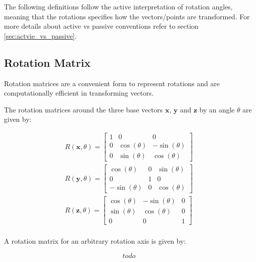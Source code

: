 \documentclass[a4paper]{paper}
\begin{document}
The following definitions follow the active interpretation of rotation angles, meaning that the rotations specifies how the vectors/points are transformed. For more details about active vs passive conventions refer to section \ref{sec:actvie_vs_passive}.

\subsection{Rotation Matrix}

Rotation matrices are a convenient form to represent rotations and are computationally efficient in transforming vectors.

The rotation matrices around the three base vectors $\bm{x}$, $\bm{y}$ and $\bm{z}$ by an angle $\theta$ are given by:

\begin{equation}
\begin{split}
    R(\bm{x}, \theta) =
    \left[\begin{matrix}1 & 0 & 0\\
    0 & \cos{\left (\theta \right )} & - \sin{\left (\theta \right )}\\
    0 & \sin{\left (\theta \right )} & \cos{\left (\theta \right )}\end{matrix}\right]\\
    R(\bm{y}, \theta) =
    \left[\begin{matrix}\cos{\left (\theta \right )} & 0 & \sin{\left (\theta \right )}\\
    0 & 1 & 0\\
    - \sin{\left (\theta \right )} & 0 & \cos{\left (\theta \right )}\end{matrix}\right]\\
    R(\bm{z}, \theta) =
    \left[\begin{matrix}\cos{\left (\theta \right )} & - \sin{\left (\theta \right )} & 0\\
    \sin{\left (\theta \right )} & \cos{\left (\theta \right )} & 0\\
    0 & 0 & 1\end{matrix}\right]\\
\end{split}
\end{equation}


A rotation matrix for an arbitrary rotation axis is given by:

\begin{equation}
    todo
    \label{eq:rotation_matrix_angle_axis}
\end{equation}
\end{document}

